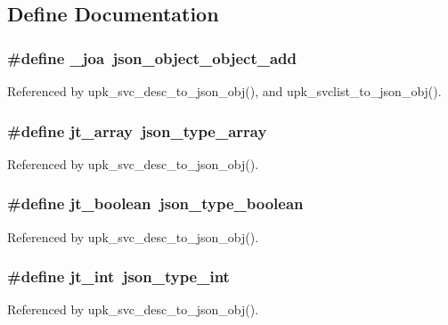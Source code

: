 \subsection{Define Documentation}
\subsubsection[{\_\-joa}]{\setlength{\rightskip}{0pt plus 5cm}\#define \_\-joa~json\_\-object\_\-object\_\-add}\label{group__config__impl_gac8445621620fa3b4e61a39c9af92cce3}


Referenced by upk\_\-svc\_\-desc\_\-to\_\-json\_\-obj(), and upk\_\-svclist\_\-to\_\-json\_\-obj().

\subsubsection[{jt\_\-array}]{\setlength{\rightskip}{0pt plus 5cm}\#define jt\_\-array~json\_\-type\_\-array}\label{group__config__impl_ga9180255338c47b6269f08158ba6574c2}


Referenced by upk\_\-svc\_\-desc\_\-to\_\-json\_\-obj().

\subsubsection[{jt\_\-boolean}]{\setlength{\rightskip}{0pt plus 5cm}\#define jt\_\-boolean~json\_\-type\_\-boolean}\label{group__config__impl_gadbcd5a49cee9d0649ac2578803203df2}


Referenced by upk\_\-svc\_\-desc\_\-to\_\-json\_\-obj().

\subsubsection[{jt\_\-int}]{\setlength{\rightskip}{0pt plus 5cm}\#define jt\_\-int~json\_\-type\_\-int}\label{group__config__impl_ga493a64297e93d490b06fee43ec1b4376}


Referenced by upk\_\-svc\_\-desc\_\-to\_\-json\_\-obj().

